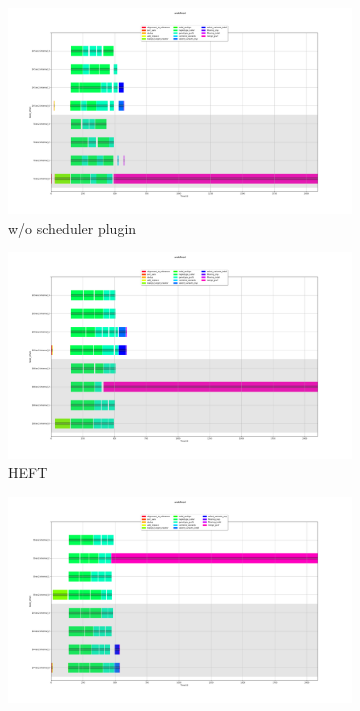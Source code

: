 
\begin{figure}[H]
\begin{subfigure}{0.75\textwidth}
\centering
\includegraphics[width=1\linewidth]{figures/6-1-soykb-empty.png}
\caption[Selected example execution trace for SoyKB workflow without static scheduling]{w/o scheduler plugin}
\label{fig:evaluation:sched:soykb:empty}
\end{subfigure}
\begin{subfigure}{0.75\textwidth}
\centering
\includegraphics[width=1\linewidth]{figures/6-1-soykb-heft.png}
\caption[Selected example execution traces for SoyKB workflow with HEFT]{HEFT}
\label{fig:evaluation:sched:soykb:heft}
\end{subfigure}
\begin{subfigure}{0.75\textwidth}
\centering
\includegraphics[width=1\linewidth]{figures/6-1-soykb-peft.png}

\end{subfigure}
\end{figure}
